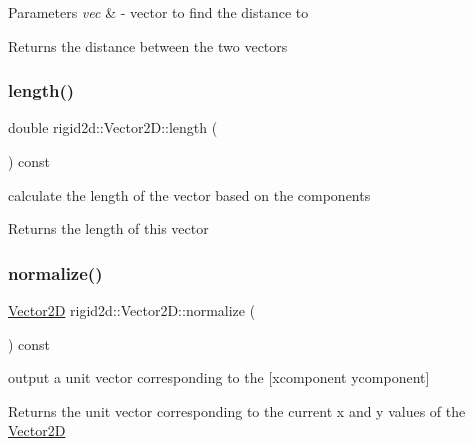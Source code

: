 \begin{DoxyParams}{Parameters}
{\em vec} & -\/ vector to find the distance to \\
\hline
\end{DoxyParams}
\begin{DoxyReturn}{Returns}
the distance between the two vectors 
\end{DoxyReturn}
\mbox{\label{structrigid2d_1_1Vector2D_afe2117dc061b3f09c890ac13dd59c345}} 
\subsubsection{\texorpdfstring{length()}{length()}}
{\footnotesize\ttfamily double rigid2d\+::\+Vector2\+D\+::length (\begin{DoxyParamCaption}{ }\end{DoxyParamCaption}) const}



calculate the length of the vector based on the components 

\begin{DoxyReturn}{Returns}
the length of this vector 
\end{DoxyReturn}
\mbox{\label{structrigid2d_1_1Vector2D_a6534f1075f8f3338261331c954b449b2}} 
\subsubsection{\texorpdfstring{normalize()}{normalize()}}
{\footnotesize\ttfamily \hyperlink{structrigid2d_1_1Vector2D}{Vector2D} rigid2d\+::\+Vector2\+D\+::normalize (\begin{DoxyParamCaption}{ }\end{DoxyParamCaption}) const}



output a unit vector corresponding to the \mbox{[}xcomponent ycomponent\mbox{]} 

\begin{DoxyReturn}{Returns}
the unit vector corresponding to the current x and y values of the \hyperlink{structrigid2d_1_1Vector2D}{Vector2D} 
\end{DoxyReturn}
\mbox{\label{structrigid2d_1_1Vector2D_a0da46fe8a92fcb6ecea09425c6ead294}} 
